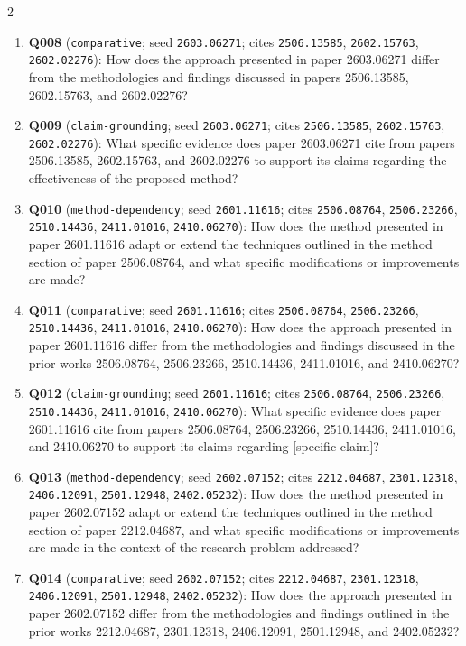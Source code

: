 \documentclass[10pt]{article}
\begin{document}
{\begin{multicols}{2}
\begin{enumerate}[leftmargin=1.0em,itemsep=0.05em,topsep=0pt,parsep=0pt]
  \item \textbf{Q008} (\texttt{comparative}; seed \texttt{2603.06271}; cites \texttt{2506.13585}, \texttt{2602.15763}, \texttt{2602.02276}): How does the approach presented in paper 2603.06271 differ from the methodologies and findings discussed in papers 2506.13585, 2602.15763, and 2602.02276?
  \item \textbf{Q009} (\texttt{claim-grounding}; seed \texttt{2603.06271}; cites \texttt{2506.13585}, \texttt{2602.15763}, \texttt{2602.02276}): What specific evidence does paper 2603.06271 cite from papers 2506.13585, 2602.15763, and 2602.02276 to support its claims regarding the effectiveness of the proposed method?
  \item \textbf{Q010} (\texttt{method-dependency}; seed \texttt{2601.11616}; cites \texttt{2506.08764}, \texttt{2506.23266}, \texttt{2510.14436}, \texttt{2411.01016}, \texttt{2410.06270}): How does the method presented in paper 2601.11616 adapt or extend the techniques outlined in the method section of paper 2506.08764, and what specific modifications or improvements are made?
  \item \textbf{Q011} (\texttt{comparative}; seed \texttt{2601.11616}; cites \texttt{2506.08764}, \texttt{2506.23266}, \texttt{2510.14436}, \texttt{2411.01016}, \texttt{2410.06270}): How does the approach presented in paper 2601.11616 differ from the methodologies and findings discussed in the prior works 2506.08764, 2506.23266, 2510.14436, 2411.01016, and 2410.06270?
  \item \textbf{Q012} (\texttt{claim-grounding}; seed \texttt{2601.11616}; cites \texttt{2506.08764}, \texttt{2506.23266}, \texttt{2510.14436}, \texttt{2411.01016}, \texttt{2410.06270}): What specific evidence does paper 2601.11616 cite from papers 2506.08764, 2506.23266, 2510.14436, 2411.01016, and 2410.06270 to support its claims regarding [specific claim]?
  \item \textbf{Q013} (\texttt{method-dependency}; seed \texttt{2602.07152}; cites \texttt{2212.04687}, \texttt{2301.12318}, \texttt{2406.12091}, \texttt{2501.12948}, \texttt{2402.05232}): How does the method presented in paper 2602.07152 adapt or extend the techniques outlined in the method section of paper 2212.04687, and what specific modifications or improvements are made in the context of the research problem addressed?
  \item \textbf{Q014} (\texttt{comparative}; seed \texttt{2602.07152}; cites \texttt{2212.04687}, \texttt{2301.12318}, \texttt{2406.12091}, \texttt{2501.12948}, \texttt{2402.05232}): How does the approach presented in paper 2602.07152 differ from the methodologies and findings outlined in the prior works 2212.04687, 2301.12318, 2406.12091, 2501.12948, and 2402.05232?

\end{enumerate}
\end{multicols}}
\end{document}
